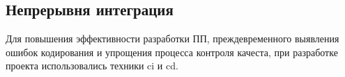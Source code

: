 \subsection{Непрерывня интеграция}
\label{sec:testing:ci}

Для повышения эффективности разработки ПП, преждевременного выявления ошибок кодирования и упрощения процесса контроля качеста, при разработке проекта использовались техники \gls{ci} и \gls{cd}.


